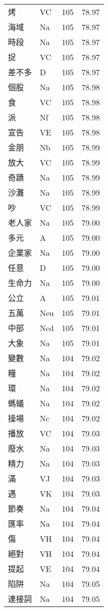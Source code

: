 \documentclass[twocolumn]{book}
\begin{document}
\begin{supertabular}{llrr}
烤 & VC & 105 &  78.97\\
海域 & Na & 105 &  78.97\\
時段 & Na & 105 &  78.97\\
捉 & VC & 105 &  78.97\\
差不多 & D & 105 &  78.97\\
個股 & Na & 105 &  78.98\\
食 & VC & 105 &  78.98\\
派 & Nf & 105 &  78.98\\
宣告 & VE & 105 &  78.98\\
金朋 & Nb & 105 &  78.99\\
放大 & VC & 105 &  78.99\\
奇蹟 & Na & 105 &  78.99\\
沙灘 & Na & 105 &  78.99\\
吵 & VC & 105 &  78.99\\
老人家 & Na & 105 &  79.00\\
多元 & A & 105 &  79.00\\
企業家 & Na & 105 &  79.00\\
任意 & D & 105 &  79.00\\
生命力 & Na & 105 &  79.00\\
公立 & A & 105 &  79.01\\
五萬 & Neu & 105 &  79.01\\
中部 & Ncd & 105 &  79.01\\
大象 & Na & 105 &  79.01\\
變數 & Na & 104 &  79.02\\
糧 & Na & 104 &  79.02\\
環 & Na & 104 &  79.02\\
螞蟻 & Na & 104 &  79.02\\
操場 & Nc & 104 &  79.02\\
播放 & VC & 104 &  79.03\\
廢水 & Na & 104 &  79.03\\
精力 & Na & 104 &  79.03\\
滿 & VJ & 104 &  79.03\\
遇 & VK & 104 &  79.03\\
節奏 & Na & 104 &  79.04\\
匯率 & Na & 104 &  79.04\\
傷 & VH & 104 &  79.04\\
絕對 & VH & 104 &  79.04\\
提起 & VE & 104 &  79.04\\
陷阱 & Na & 104 &  79.05\\
連接詞 & Na & 104 &  79.05\\

\end{supertabular}
\end{document}
